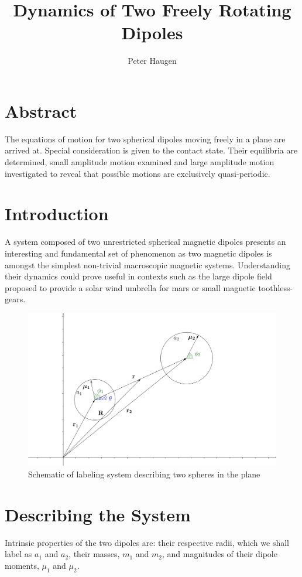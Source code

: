 \documentclass[prb,preprint]{revtex4-1}
\begin{document}
\title{Dynamics of Two Freely Rotating Dipoles}
\author{Peter Haugen}

\maketitle

\section{Abstract}
	The equations of motion for two spherical dipoles moving freely in a plane are arrived at. Special consideration is given to the contact state. Their equilibria are determined, small amplitude motion examined and large amplitude motion investigated to reveal that possible motions are exclusively quasi-periodic.
	
\section{Introduction}
A system composed of two unrestricted spherical magnetic dipoles presents an interesting and fundamental set of phenomenon as two magnetic dipoles is amongst the simplest non-trivial macroscopic magnetic systems. Understanding their dynamics could prove useful in contexts such as the large dipole field proposed to provide a solar wind umbrella for mars or small magnetic toothless-gears.


\begin{figure}[h]
  \centering
  \includegraphics[width=.85\linewidth]{./images/coordinates.png}
  \caption{Schematic of labeling system describing two spheres in the plane}
\end{figure}



\section{Describing the System}
Intrinsic properties of the two dipoles are: their respective radii, which we shall label as $a_1$ and $a_2$, their masses, $m_1$ and $m_2$, and magnitudes of their dipole moments, $\mu_1$ and $\mu_2$.
\end{document}
